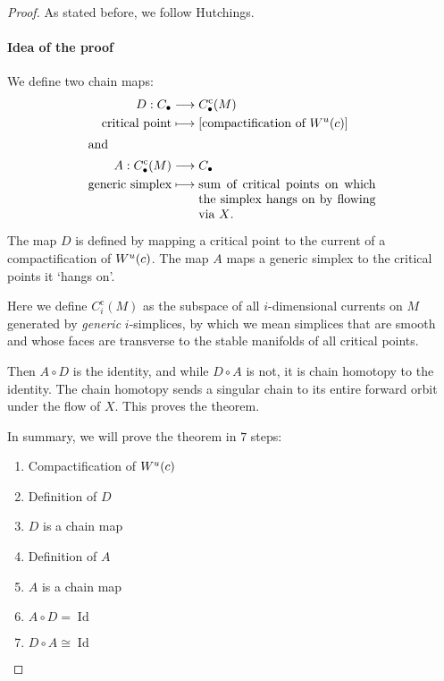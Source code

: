 \begin{proof}
    As stated before, we follow Hutchings.
    \paragraph{Idea of the proof}
    
    We define two chain maps:
    \begin{align*}
        D: C_\bul &\longrightarrow C_\bul^{\text{c}}(M) \\
         \text{critical point}&\longmapsto [\text{compactification of $\unstable{c}$}]\\
         \shortintertext{and}
        A: C_\bul^{\text{c}}(M) &\longrightarrow C_\bul \\
         \text{generic simplex} &\longmapsto 
         \parbox[t][][t]{5cm}{sum of critical points on which the simplex hangs on by flowing via $X$.}
    \end{align*}
\begin{marginfigure}
    \centering
    \caption{The map $D$ is defined by mapping a critical point to the current of a compactification of $W^u(c)$. The map $A$ maps a generic simplex to the critical points it `hangs on'.}
    \label{fig:idea-of-the-proof-maps-a-and-d}
\end{marginfigure}

    Here we define $C_i^{\text{c}}(M)$ as the subspace of all  $i$-dimensional currents on $M$ generated by \emph{generic} $i$-simplices, by which we mean simplices that are smooth and whose faces are transverse to the stable manifolds of all critical points.


    Then $A  \circ D$ is the identity, and while $D  \circ  A$ is not, it is chain homotopy to the identity.
    The chain homotopy sends a singular chain to its entire forward orbit under the flow of $X$.
    This proves the theorem.

    In summary, we will prove the theorem in $7$ steps:
    \begin{enumerate}
        \item Compactification of $W^u(c)$
        \item Definition of $D$
        \item $D$ is a chain map
        \item Definition of $A$
        \item $A$ is a chain map
        \item $A  \circ D = \operatorname{Id}$
        \item  $D  \circ A \cong \operatorname{Id}$
    \end{enumerate}


\end{proof}
